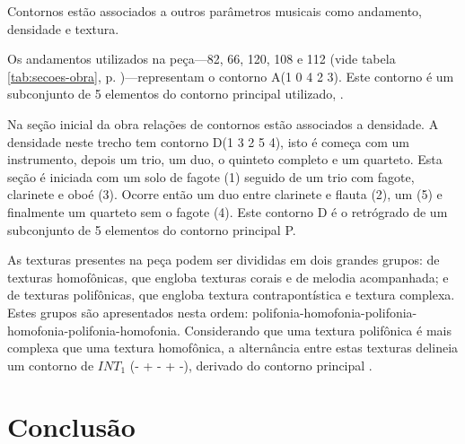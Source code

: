 Contornos estão associados a outros parâmetros musicais como
andamento, densidade e textura.

Os andamentos utilizados na peça---82, 66, 120, 108 e 112 (vide tabela
\ref{tab:secoes-obra}, p. \pageref{tab:secoes-obra})---representam o
contorno A(1 0 4 2 3). Este contorno é um subconjunto de 5 elementos
do contorno principal utilizado, \contpr{}.

Na seção inicial da obra relações de contornos estão associados a
densidade. A densidade neste trecho tem contorno D(1 3 2 5 4), isto é
começa com um instrumento, depois um trio, um duo, o quinteto completo
e um quarteto. Esta seção é iniciada com um solo de fagote (1) seguido
de um trio com fagote, clarinete e oboé (3). Ocorre então um duo entre
clarinete e flauta (2), um  (5) e finalmente um quarteto
sem o fagote (4). Este contorno D é o retrógrado de um subconjunto de
5 elementos do contorno principal P.

As texturas presentes na peça podem ser divididas em dois grandes
grupos: de texturas homofônicas, que engloba texturas corais e de
melodia acompanhada; e de texturas polifônicas, que engloba textura
contrapontística e textura complexa. Estes grupos são apresentados
nesta ordem:
polifonia-homofonia-polifonia-homofonia-polifonia-homofonia. Considerando
que uma textura polifônica é mais complexa que uma textura homofônica,
a alternância entre estas texturas delineia um contorno de $INT_1$ (-
+ - + -), derivado do contorno principal \contpr{}.

\chapter{Conclusão}
\label{cha:conclusao}
